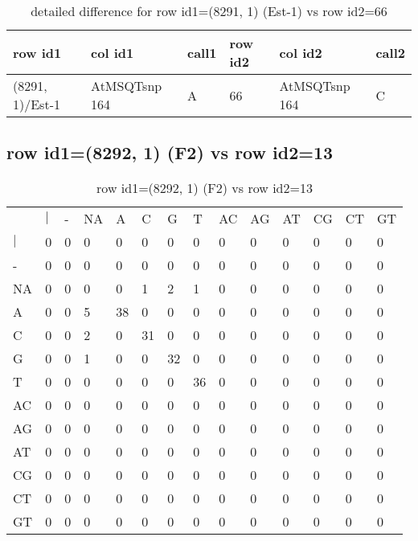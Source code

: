 \begin{center}
\begin{longtable}{|l|l|l|l|l|l|}
\caption{detailed difference for row id1=(8291, 1) (Est-1) vs row id2=66} \label{table_dm261}\\
\hline
row id1&col id1&call1&row id2&col id2&call2\\
\hline
(8291, 1)/Est-1&AtMSQTsnp 164&A&66&AtMSQTsnp 164&C\\
\hline
\end{longtable}
\end{center}

\subsection{row id1=(8292, 1) (F2) vs row id2=13}
\begin{center}
\begin{longtable}{|l|l|l|l|l|l|l|l|l|l|l|l|l|l|}
\caption{row id1=(8292, 1) (F2) vs row id2=13} \label{table_dm262}\\
\hline
\\
\hline
&$|$&-&NA&A&C&G&T&AC&AG&AT&CG&CT&GT\\
$|$&0&0&0&0&0&0&0&0&0&0&0&0&0\\
-&0&0&0&0&0&0&0&0&0&0&0&0&0\\
NA&0&0&0&0&1&2&1&0&0&0&0&0&0\\
A&0&0&5&38&0&0&0&0&0&0&0&0&0\\
C&0&0&2&0&31&0&0&0&0&0&0&0&0\\
G&0&0&1&0&0&32&0&0&0&0&0&0&0\\
T&0&0&0&0&0&0&36&0&0&0&0&0&0\\
AC&0&0&0&0&0&0&0&0&0&0&0&0&0\\
AG&0&0&0&0&0&0&0&0&0&0&0&0&0\\
AT&0&0&0&0&0&0&0&0&0&0&0&0&0\\
CG&0&0&0&0&0&0&0&0&0&0&0&0&0\\
CT&0&0&0&0&0&0&0&0&0&0&0&0&0\\
GT&0&0&0&0&0&0&0&0&0&0&0&0&0\\
\hline
\end{longtable}
\end{center}

